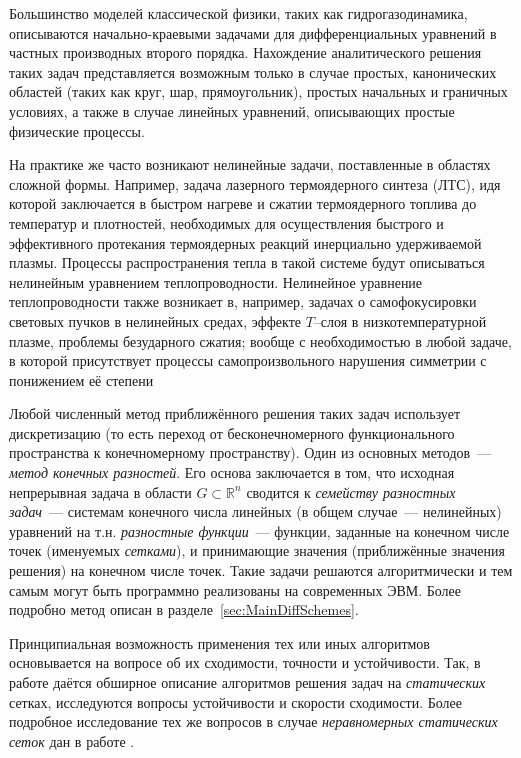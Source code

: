 Большинство моделей классической физики, таких как гидрогазодинамика, описываются начально-краевыми задачами для дифференциальных уравнений в частных производных второго порядка\cite{ТихоновСамарский, ЛандауГидродинамика}.
Нахождение аналитического решения таких задач представляется возможным только в случае простых, канонических областей (таких как круг, шар, прямоугольник), простых начальных и граничных условиях, а также в случае линейных уравнений, описывающих простые физические процессы.

На практике же часто возникают нелинейные задачи, поставленные в областях сложной формы.
Например, задача лазерного термоядерного синтеза (ЛТС), идя которой заключается в быстром нагреве и сжатии термоядерного топлива до температур и плотностей, необходимых для осуществления быстрого и эффективного протекания термоядерных реакций инерциально удерживаемой плазмы.
Процессы распространения тепла в такой системе будут описываться нелинейным уравнением теплопроводности.
Нелинейное уравнение теплопроводности также возникает в, например, задачах о самофокусировки световых пучков в нелинейных средах, эффекте $T$--слоя в низкотемпературной плазме, проблемы безударного сжатия; вообще с необходимостью в любой задаче, в которой присутствует процессы самопроизвольного нарушения симметрии с понижением её степени \cite{ГалактионовКвазилинейное} 

Любой численный метод приближённого решения таких задач использует дискретизацию (то есть переход от бесконечномерного функционального пространства к конечномерному пространству).
Один из основных методов~--- \emph{метод конечных разностей}.
Его основа заключается в том, что исходная непрерывная задача в области $G \subset \mathbb{R}^n$ сводится к \emph{семейству разностных задач}~--- системам конечного числа линейных (в общем случае~--- нелинейных) уравнений на т.н. \emph{разностные функции}~--- функции, заданные на конечном числе точек (именуемых \emph{сетками}), и принимающие значения (приближённые значения решения) на конечном числе точек.
Такие задачи решаются алгоритмически и тем самым могут быть программно реализованы на современных ЭВМ.
Более подробно метод описан в разделе~\ref{sec:MainDiffSchemes}.

Принципиальная возможность применения тех или иных алгоритмов основывается на вопросе об их сходимости, точности и устойчивости.
Так, в работе \cite{СамарскийТеорияРазностныхСхем} даётся обширное описание алгоритмов решения задач на \emph{статических} сетках, исследуются вопросы устойчивости и скорости сходимости.
Более подробное исследование тех же вопросов в случае \emph{неравномерных статических сеток} дан в работе \cite{СамарскийНеравномерныеСетки}.

